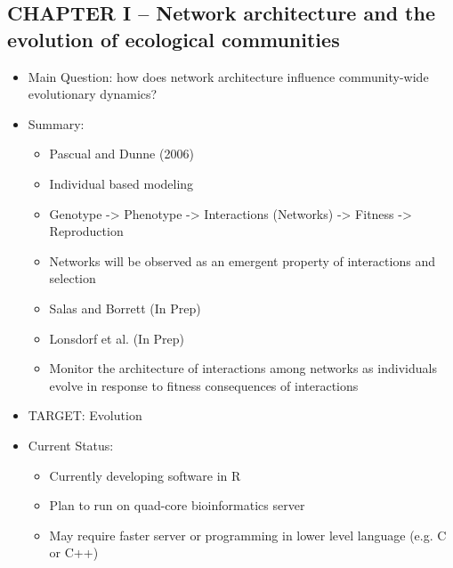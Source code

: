 \documentclass[12pt]{article}
\begin{document}
\subsection{CHAPTER I -- Network architecture and the evolution of ecological
  communities}
\begin{itemize}
\item Main Question: how does network architecture influence
  community-wide evolutionary dynamics?
\item Summary:
  \begin{itemize}
  \item Pascual and Dunne (2006) \cite{pascual2005}
  \item Individual based modeling \cite{deangelis1992}
  \item Genotype -> Phenotype -> Interactions (Networks) -> Fitness -> Reproduction
  \item Networks will be observed as an emergent property of
    interactions and selection
  \item Salas and Borrett (In Prep) \cite{salasinprep}
  \item Lonsdorf et al. (In Prep) \cite{lonsdorfinprep}
  \item Monitor the architecture of interactions among networks as
    individuals evolve in response to fitness consequences of interactions
  \end{itemize}
\item TARGET: Evolution
\item Current Status: 
  \begin{itemize}
  \item Currently developing software in R
  \item Plan to run on quad-core bioinformatics server
  \item May require faster server or programming in lower level
    language (e.g. C or C++)
  \end{itemize}
\end{itemize}
\end{document}

